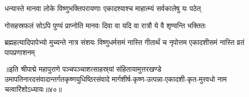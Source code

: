 \twolineshloka
{धन्यास्ते मानवा लोके विष्णुभक्तिपरायणाः}
{एकादश्याश्च माहात्म्यं सर्वकालेषु यः पठेत्}%

\twolineshloka
{गोसहस्रफलं सोऽपि पुण्यं प्राप्नोति मानवः}
{दिवा वा यदि वा रात्रौ ये वै शृण्वन्ति भक्तितः}%

\threelineshloka
{ब्रह्महत्यादिपापेभ्यो मुच्यन्ते नात्र संशयः}
{विष्णुधर्मसमं नास्ति गीतार्थं च नृपोत्तम}
{एकादशीसमं नास्ति व्रतं पापप्रणाशनम्}%

॥इति श्रीपाद्मे महापुराणे पञ्चपञ्चाशत्साहस्र्यां संहितायामुत्तरखण्डे उमापतिनारदसंवादान्तर्गतकृष्णयुधिष्ठिरसंवादे मार्गशीर्ष-कृष्ण-उत्पन्ना-एकादशी-कृत-मुरवधो नाम चत्वारिंशोऽध्यायः॥४०॥

\genMangalaShloka

\hyperref[sec:ekadashi_mahatmyam_padma_puranam]{\closesub}
\clearpage


